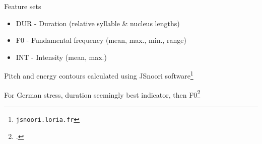 \documentclass[xcolor={dvipsnames}]{beamer}
\begin{document}
		\begin{frame}{Feature sets}
		
%		

			\begin{itemize}
			\item{DUR - Duration (relative syllable \& nucleus lengths)
			}
			\item{F0 - Fundamental frequency (mean, max., min., range)
			}
			\item{INT - Intensity (mean, max.)
			}
			\end{itemize}		
			
%			
			
			\vspace{1em}
			
			Pitch and energy contours calculated using JSnoori software\footnote{\texttt{jsnoori.loria.fr}}%
			
			\vfill
			
			For German stress, duration seemingly best indicator, then F0\footcite{Dogil1999}
		
		\end{frame}
		
\end{document}
